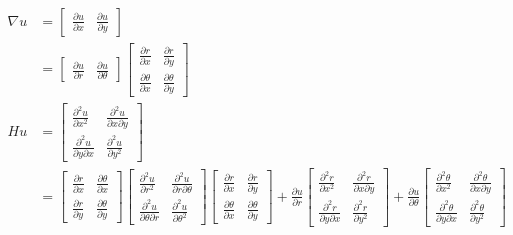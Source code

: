 \documentclass[11pt,letterpaper]{report}
\newcommand\<{\langle}
\renewcommand\>{\rangle}
\begin{document}
\begin{align*}
  \nabla u
  &=
  \begin{bmatrix}
    \frac{\partial u}{\partial x} &
    \frac{\partial u}{\partial y}
  \end{bmatrix} \\
  &=
  \begin{bmatrix}
    \frac{\partial u}{\partial r} &
    \frac{\partial u}{\partial \theta}
  \end{bmatrix}
  \begin{bmatrix}
    \frac{\partial r}{\partial x} &
    \frac{\partial r}{\partial y} \\[1mm]
    \frac{\partial \theta}{\partial x} &
    \frac{\partial \theta}{\partial y}
  \end{bmatrix}
  \\
  Hu
  &=
  \begin{bmatrix}
    \frac{\partial ^{2}u}{\partial x^{2}} & 
    \frac{\partial ^{2}u}{\partial x\partial y} \\[1mm]
    \frac{\partial ^{2}u}{\partial y\partial x} & 
    \frac{\partial ^{2}u}{\partial y^{2}}
  \end{bmatrix} \\
  &=
  \begin{bmatrix}
    \frac{\partial r}{\partial x} &
    \frac{\partial \theta}{\partial x} \\[1mm]
    \frac{\partial r}{\partial y} &
    \frac{\partial \theta}{\partial y}
  \end{bmatrix}
  \begin{bmatrix}
    \frac{\partial ^{2}u}{\partial r^{2}} & 
    \frac{\partial ^{2}u}{\partial r\partial\theta} \\[1mm]
    \frac{\partial ^{2}u}{\partial \theta\partial r} & 
    \frac{\partial ^{2}u}{\partial \theta^{2}}
  \end{bmatrix}
  \begin{bmatrix}
    \frac{\partial r}{\partial x} &
    \frac{\partial r}{\partial y} \\[1mm]
    \frac{\partial \theta}{\partial x} &
    \frac{\partial \theta}{\partial y}
  \end{bmatrix}
  +
  \frac{\partial u}{\partial r}
  \begin{bmatrix}
    \frac{\partial ^{2}r}{\partial x^{2}} & 
    \frac{\partial ^{2}r}{\partial x\partial y} \\[1mm]
    \frac{\partial ^{2}r}{\partial y\partial x} & 
    \frac{\partial ^{2}r}{\partial y^{2}}
  \end{bmatrix}
  +
  \frac{\partial u}{\partial \theta}
  \begin{bmatrix}
    \frac{\partial ^{2}\theta}{\partial x^{2}} & 
    \frac{\partial ^{2}\theta}{\partial x\partial y} \\[1mm]
    \frac{\partial ^{2}\theta}{\partial y\partial x} & 
    \frac{\partial ^{2}\theta}{\partial y^{2}}
  \end{bmatrix}
\end{align*}
\end{document}
